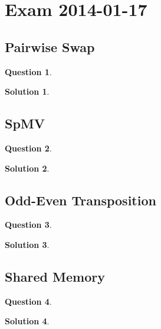 \documentclass[a4paper, 10pt, oneside]{article}
\theoremstyle{definition}
\newtheorem*{question}{Question}
\newtheorem*{solution}{Solution}
\begin{document}
\section{Exam 2014-01-17}

\subsection{Pairwise Swap}
\begin{question}
\end{question}
\begin{solution}
\end{solution}

\subsection{SpMV}
\begin{question}
\end{question}
\begin{solution}
\end{solution}

\subsection{Odd-Even Transposition}
\begin{question}
\end{question}
\begin{solution}
\end{solution}

\subsection{Shared Memory}
\begin{question}
\end{question}
\begin{solution}
\end{solution}

\newpage
\appendix
\printbibliography
\end{document}

